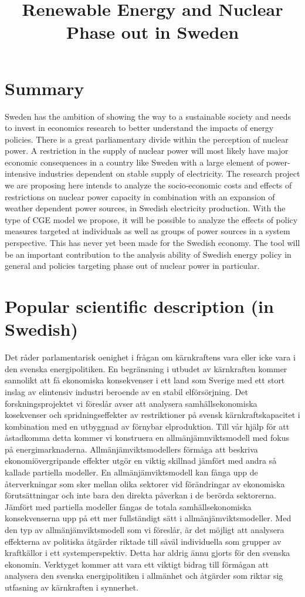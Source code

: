 \documentclass[10pt,a4paper]{article}
\begin{document}
\title{Renewable Energy and Nuclear Phase out in Sweden}
\date{}
\author{}
\maketitle

\section{Summary}
Sweden has the ambition of showing the way to a sustainable society and needs to invest in economics research to better understand the impacts of energy policies. There is a great parliamentary divide within the perception of nuclear power. A restriction in the supply of nuclear power will most likely have major economic consequences in a country like Sweden with a large element of power-intensive industries dependent on stable supply of electricity. The research project we are proposing here intends to analyze the socio-economic costs and effects of restrictions on nuclear power capacity in combination with an expansion of weather dependent power sources, in Swedish electricity production. With the type of CGE model we propose, it will be possible to analyze the effects of policy measures targeted at individuals as well as groups of power sources in a system perspective. This has never yet been made for the Swedish economy. The tool will be an important contribution to the analysis ability of Swedish energy policy in general and policies targeting phase out of nuclear power in particular.
\section{Popular scientific description (in Swedish)}
Det råder parlamentarisk oenighet i frågan om kärnkraftens vara eller icke vara i den svenska energipolitiken. En begränsning i utbudet av kärnkraften kommer sannolikt att få ekonomiska konsekvenser i ett land som Sverige med ett stort inslag av elintensiv industri beroende av en stabil elförsörjning. Det forskningsprojektet vi föreslår avser att analysera samhällsekonomiska kosekvenser och spridningseffekter av restriktioner på svensk kärnkraftskapacitet i kombination med en utbyggnad av förnybar elproduktion. Till vår hjälp för att åstadkomma detta kommer vi konstruera en allmänjämnviktsmodell med fokus på energimarknaderna. Allmänjämviktsmodellers förmåga att beskriva ekonomiövergripande effekter utgör en viktig skillnad jämfört med andra så kallade partiella modeller. En allmänjämviktsmodell kan fånga upp de återverkningar som sker mellan olika sektorer vid förändringar av ekonomiska förutsättningar och inte bara den direkta påverkan i de berörda sektorerna. Jämfört med partiella modeller fångas de totala samhällsekonomiska konsekvenserna upp på ett mer fullständigt sätt i allmänjämviktsmodeller. Med den typ av allmänjämviktsmodell som vi föreslår, är det möjligt att analysera effekterna av politiska åtgärder riktade till såväl individuella som grupper av kraftkällor i ett systemperspektiv. Detta har aldrig ännu gjorts för den svenska ekonomin. Verktyget kommer att vara ett viktigt bidrag till förmågan att analysera den svenska energipolitiken i allmänhet och åtgärder som riktar sig utfasning av kärnkraften i synnerhet.
\end{document}
